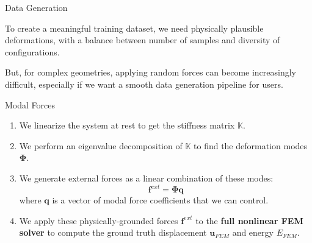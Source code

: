 \documentclass{beamer}
\begin{document}
\begin{frame}[allowframebreaks]{Data Generation}
    
    To create a meaningful training dataset, we need physically plausible deformations, with a balance between number of samples and diversity of configurations.

    But, for complex geometries, applying random forces can become increasingly difficult, especially if we want a smooth data generation pipeline for users. 

    
    \begin{block}{Modal Forces}
        \begin{enumerate}
            \item We linearize the system at rest to get the stiffness matrix \(\mathbb{K}\).
            
            \item We perform an eigenvalue decomposition of \(\mathbb{K}\) to find the deformation modes \(\boldsymbol{\Phi}\).
            
            \item We generate external forces as a linear combination of these modes:
            \begin{equation*}
                \bm{f}^{ext} = \boldsymbol{\Phi} \bm{q}
            \end{equation*}
            where \(\bm{q}\) is a vector of modal force coefficients that we can control.
            
            \item We apply these physically-grounded forces \(\bm{f}^{ext}\) to the \textbf{full nonlinear FEM solver} to compute the ground truth displacement \(\bm{u}_{FEM}\) and energy \(E_{FEM}\).
        \end{enumerate}
    \end{block}
    
\end{frame}
\end{document}

